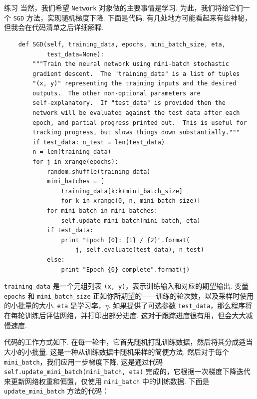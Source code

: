 \begin{exerciseBox}{练习}
当然，我们希望 \texttt{Network} 对象做的主要事情是学习. 为此，我们将给它们一个 \texttt{SGD} 方法，实现随机梯度下降. 下面是代码. 有几处地方可能看起来有些神秘，但我会在代码清单之后详细解释.

\begin{lstlisting}
    def SGD(self, training_data, epochs, mini_batch_size, eta,
            test_data=None):
        """Train the neural network using mini-batch stochastic
        gradient descent.  The "training_data" is a list of tuples
        "(x, y)" representing the training inputs and the desired
        outputs.  The other non-optional parameters are
        self-explanatory.  If "test_data" is provided then the
        network will be evaluated against the test data after each
        epoch, and partial progress printed out.  This is useful for
        tracking progress, but slows things down substantially."""
        if test_data: n_test = len(test_data)
        n = len(training_data)
        for j in xrange(epochs):
            random.shuffle(training_data)
            mini_batches = [
                training_data[k:k+mini_batch_size]
                for k in xrange(0, n, mini_batch_size)]
            for mini_batch in mini_batches:
                self.update_mini_batch(mini_batch, eta)
            if test_data:
                print "Epoch {0}: {1} / {2}".format(
                    j, self.evaluate(test_data), n_test)
            else:
                print "Epoch {0} complete".format(j)

\end{lstlisting}

\texttt{training\_\allowbreak{}data} 是一个元组列表 \texttt{(x, y)}，表示训练输入和对应的期望输出. 变量 \texttt{epochs} 和 \texttt{mini\_\allowbreak{}batch\_\allowbreak{}size} 正如你所期望的——训练的轮次数，以及采样时使用的小批量的大小. \texttt{eta} 是学习率，$\eta$. 如果提供了可选参数 \texttt{test\_\allowbreak{}data}，那么程序将在每轮训练后评估网络，并打印出部分进度. 这对于跟踪进度很有用，但会大大减慢速度.

代码的工作方式如下. 在每一轮中，它首先随机打乱训练数据，然后将其分成适当大小的小批量. 这是一种从训练数据中随机采样的简便方法. 然后对于每个 \texttt{mini\_\allowbreak{}batch}，我们应用一步梯度下降. 这是通过代码 \texttt{self.update\_\allowbreak{}mini\_\allowbreak{}batch(mini\_\allowbreak{}batch, eta)} 完成的，它根据一次梯度下降迭代来更新网络权重和偏置，仅使用 \texttt{mini\_\allowbreak{}batch} 中的训练数据. 下面是 \texttt{update\_\allowbreak{}mini\_\allowbreak{}batch} 方法的代码：


\end{exerciseBox}
